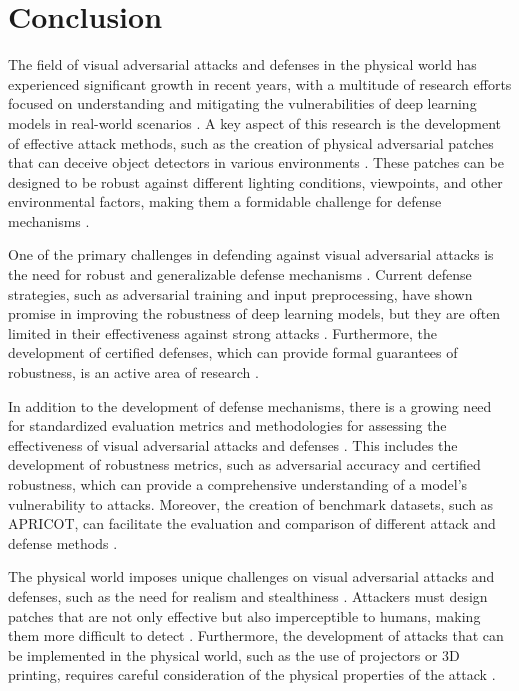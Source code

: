 \documentclass[11pt,a4paper]{article}
\begin{document}
\section{Conclusion}


The field of visual adversarial attacks and defenses in the physical world has experienced significant growth in recent years, with a multitude of research efforts focused on understanding and mitigating the vulnerabilities of deep learning models in real-world scenarios \cite{doi:10.1145/3128572.3140444}. A key aspect of this research is the development of effective attack methods, such as the creation of physical adversarial patches that can deceive object detectors in various environments \cite{arxiv:1707.08945}. These patches can be designed to be robust against different lighting conditions, viewpoints, and other environmental factors, making them a formidable challenge for defense mechanisms \cite{arxiv:1712.09665}.

One of the primary challenges in defending against visual adversarial attacks is the need for robust and generalizable defense mechanisms \cite{arxiv:1902.06705}. Current defense strategies, such as adversarial training and input preprocessing, have shown promise in improving the robustness of deep learning models, but they are often limited in their effectiveness against strong attacks \cite{arxiv:1810.00069}. Furthermore, the development of certified defenses, which can provide formal guarantees of robustness, is an active area of research \cite{arxiv:2003.06693}.

In addition to the development of defense mechanisms, there is a growing need for standardized evaluation metrics and methodologies for assessing the effectiveness of visual adversarial attacks and defenses \cite{arxiv:2010.09670}. This includes the development of robustness metrics, such as adversarial accuracy and certified robustness, which can provide a comprehensive understanding of a model's vulnerability to attacks. Moreover, the creation of benchmark datasets, such as APRICOT, can facilitate the evaluation and comparison of different attack and defense methods \cite{doi:10.1007/978-3-030-58589-1_3}.

The physical world imposes unique challenges on visual adversarial attacks and defenses, such as the need for realism and stealthiness \cite{doi:10.1109/tnnls.2023.3321432}. Attackers must design patches that are not only effective but also imperceptible to humans, making them more difficult to detect \cite{doi:10.1109/tpami.2022.3176760}. Furthermore, the development of attacks that can be implemented in the physical world, such as the use of projectors or 3D printing, requires careful consideration of the physical properties of the attack \cite{doi:10.1016/j.eswa.2025.128967}.
\end{document}
